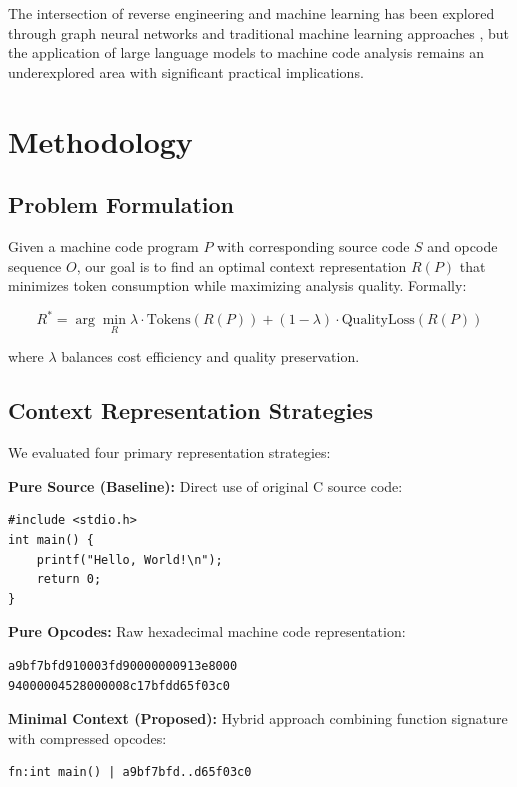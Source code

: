 \documentclass[conference]{IEEEtran}
\begin{document}
The intersection of reverse engineering and machine learning has been explored through graph neural networks \cite{marcelli2021how} and traditional machine learning approaches \cite{david2016statistical}, but the application of large language models to machine code analysis remains an underexplored area with significant practical implications.

\section{Methodology}

\subsection{Problem Formulation}

Given a machine code program $P$ with corresponding source code $S$ and opcode sequence $O$, our goal is to find an optimal context representation $R(P)$ that minimizes token consumption while maximizing analysis quality. Formally:

\begin{equation}
R^* = \arg\min_{R} \lambda \cdot \text{Tokens}(R(P)) + (1-\lambda) \cdot \text{QualityLoss}(R(P))
\end{equation}

where $\lambda$ balances cost efficiency and quality preservation.

\subsection{Context Representation Strategies}

We evaluated four primary representation strategies:

\textbf{Pure Source (Baseline):} Direct use of original C source code:
\begin{verbatim}
#include <stdio.h>
int main() {
    printf("Hello, World!\n");
    return 0;
}
\end{verbatim}

\textbf{Pure Opcodes:} Raw hexadecimal machine code representation:
\begin{verbatim}
a9bf7bfd910003fd90000000913e8000
94000004528000008c17bfdd65f03c0
\end{verbatim}

\textbf{Minimal Context (Proposed):} Hybrid approach combining function signature with compressed opcodes:
\begin{verbatim}
fn:int main() | a9bf7bfd..d65f03c0
\end{verbatim}
\end{document}
